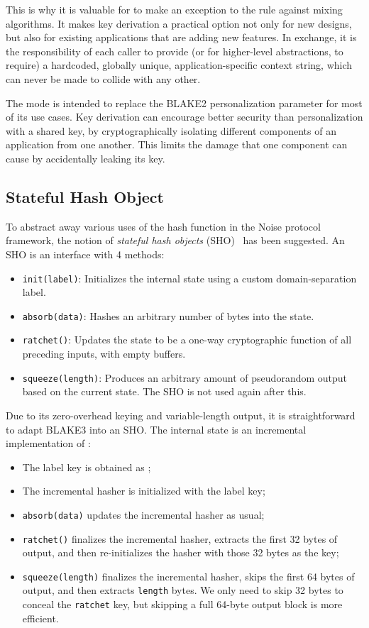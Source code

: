 \documentclass[11pt,notitlepage,a4paper]{article}
\newcommand{\flag}[1]{\texttt{\detokenize{#1}}\xspace}
\begin{document}
This is why it is valuable for \flag{derive_key} to make an exception to the
rule against mixing algorithms. It makes key derivation a practical option not
only for new designs, but also for existing applications that are adding new
features. In exchange, it is the responsibility of each caller to provide (or
for higher-level abstractions, to require) a hardcoded, globally unique,
application-specific context string, which can never be made to collide with
any other.

The \flag{derive_key} mode is intended to replace the BLAKE2 personalization
parameter for most of its use cases. Key derivation can encourage better
security than personalization with a shared key, by cryptographically isolating
different components of an application from one another. This limits the damage
that one component can cause by accidentally leaking its key.

\subsection{Stateful Hash Object}\label{sec:sho}

To abstract away various uses of the hash function in the Noise protocol framework, the notion of \emph{stateful hash objects} (SHO)~\cite{Perrin19} has been suggested. An SHO is an interface with 4 methods:
\begin{itemize}
  \item \texttt{init(label)}: Initializes the internal state using a custom domain-separation label.
  \item \texttt{absorb(data)}: Hashes an arbitrary number of bytes into the state.
  \item \texttt{ratchet()}: Updates the state to be a one-way cryptographic function of all preceding inputs, with empty buffers.
  \item \texttt{squeeze(length)}: Produces an arbitrary amount of pseudorandom output based on the current state. The SHO is not used again after this.
\end{itemize}
Due to its zero-overhead keying and variable-length output, it is straightforward to adapt BLAKE3 into an SHO. The internal state is an incremental implementation of \flag{keyed_hash}:
\begin{itemize}
    \item The label key is obtained as \flag{hash(label)};
  \item The incremental hasher is initialized with the label key;
  \item \texttt{absorb(data)} updates the incremental hasher as usual;
  \item \texttt{ratchet()} finalizes the incremental hasher, extracts the first 32 bytes of output, and then re-initializes the hasher with those 32 bytes as the key;
  \item \texttt{squeeze(length)} finalizes the incremental hasher, skips the first 64 bytes of output, and then extracts \texttt{length} bytes. We only need to skip 32 bytes to conceal the \texttt{ratchet} key, but skipping a full 64-byte output block is more efficient.
\end{itemize}
\end{document}
